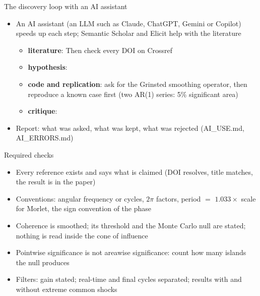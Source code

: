\begin{frame}{The discovery loop with an AI assistant}
\itemsize{\footnotesize}
\begin{itemize}
    \item An AI assistant (an LLM such as Claude, ChatGPT, Gemini or Copilot) speeds up each step; Semantic Scholar and Elicit help with the literature
    \begin{itemize}
        \item \textbf{literature}:  Then check every DOI on Crossref
        \item \textbf{hypothesis}: 
        \item \textbf{code and replication}: ask for the Grinsted smoothing operator, then reproduce a known case first (two AR(1) series: 5\% significant area)
        \item \textbf{critique}: 
    \end{itemize}
    \item Report: what was asked, what was kept, what was rejected (AI\_USE.md, AI\_ERRORS.md)
\end{itemize}
\end{frame}

\begin{frame}{Required checks}
\itemsize{\small}
\begin{itemize}
    \item Every reference exists and says what is claimed (DOI resolves, title matches, the result is in the paper)
    \item Conventions: angular frequency or cycles, $2\pi$ factors, period $=$ $1.033\times$ scale for Morlet, the sign convention of the phase
    \item Coherence is smoothed; its threshold and the Monte Carlo null are stated; nothing is read inside the cone of influence
    \item Pointwise significance is not areawise significance: count how many islands the null produces
    \item Filters: gain stated; real-time and final cycles separated; results with and without extreme common shocks
\end{itemize}
\end{frame}

